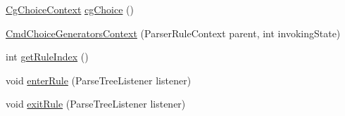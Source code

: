 \begin{DoxyCompactItemize}
\item 
\hyperlink{classgov_1_1nasa_1_1jpf_1_1inspector_1_1client_1_1parser_1_1_console_grammar_parser_1_1_cg_choice_context}{Cg\+Choice\+Context} \hyperlink{classgov_1_1nasa_1_1jpf_1_1inspector_1_1client_1_1parser_1_1_console_grammar_parser_1_1_cmd_choice_generators_context_ad697d799eb1fdfdea84f8ff0d91045bb}{cg\+Choice} ()
\item 
\hyperlink{classgov_1_1nasa_1_1jpf_1_1inspector_1_1client_1_1parser_1_1_console_grammar_parser_1_1_cmd_choice_generators_context_af90bc0936748e12241dcf9ceac2ada52}{Cmd\+Choice\+Generators\+Context} (Parser\+Rule\+Context parent, int invoking\+State)
\item 
int \hyperlink{classgov_1_1nasa_1_1jpf_1_1inspector_1_1client_1_1parser_1_1_console_grammar_parser_1_1_cmd_choice_generators_context_a8027c966da1d717c12f23918315a6278}{get\+Rule\+Index} ()
\item 
void \hyperlink{classgov_1_1nasa_1_1jpf_1_1inspector_1_1client_1_1parser_1_1_console_grammar_parser_1_1_cmd_choice_generators_context_a03a58bd839af04d405c649ac876a354d}{enter\+Rule} (Parse\+Tree\+Listener listener)
\item 
void \hyperlink{classgov_1_1nasa_1_1jpf_1_1inspector_1_1client_1_1parser_1_1_console_grammar_parser_1_1_cmd_choice_generators_context_a4e5784bcebcc5ea3a243b1c9cacb3ea3}{exit\+Rule} (Parse\+Tree\+Listener listener)
\end{DoxyCompactItemize}
